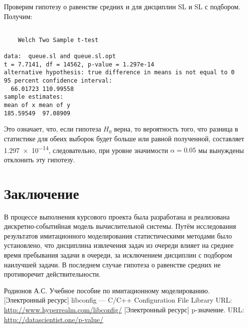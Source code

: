 \documentclass[russian, 14pt, a4paper]{extreport}
\begin{document}
Проверим гипотезу о равенстве средних и для дисциплин SL и SL с подбором. Получим:
\begin{verbatim}

	Welch Two Sample t-test

data:  queue.sl and queue.sl.opt
t = 7.7141, df = 14562, p-value = 1.297e-14
alternative hypothesis: true difference in means is not equal to 0
95 percent confidence interval:
  66.01723 110.99558
sample estimates:
mean of x mean of y 
185.59549  97.08909 

\end{verbatim}

Это означает, что, если гипотеза \(H_{0}\) верна, то вероятность того, что разница в статистике для обеих выборок будет больше или равной полученной, составляет \num{1.297e-14}, следовательно, при уровне значимости \(\alpha = 0.05\) мы вынуждены отклонить эту гипотезу.
\chapter{Заключение}
В процессе выполнения курсового проекта была разработана и реализована дискретно-событийная модель вычислительной системы. Путём исследования результатов имитационного моделирования статистическими методами было установлено, что дисциплина извлечения задач из очереди влияет на среднее время пребывания задачи в очереди, за исключением дисциплин с подбором наилучшей задачи. В последнем случае гипотеза о равенстве средних не противоречит действительности.
\begin{thebibliography}{00}
 Родионов А.С. Учебное пособие по имитационному моделированию.
 [Электронный ресурс] libconfig --- C/C++ Configuration File Library URL: \url{http://www.hyperrealm.com/libconfig/} 
 [Электронный ресурс] p-значение. URL: \url{http://datascientist.one/p-value/}  
\end{thebibliography}
\end{document}
